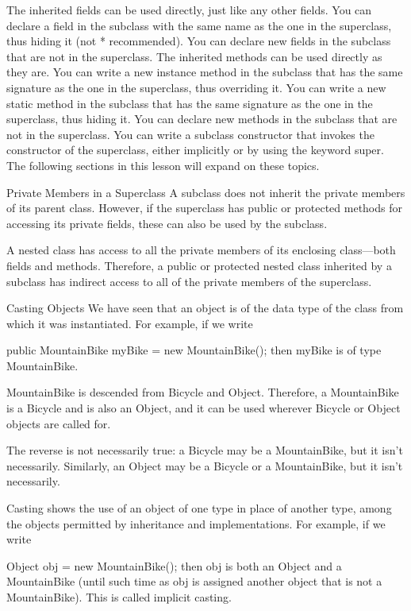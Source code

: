 The inherited fields can be used directly, just like any other fields.
You can declare a field in the subclass with the same name as the one in the superclass, thus hiding it (not * recommended).
You can declare new fields in the subclass that are not in the superclass.
The inherited methods can be used directly as they are.
You can write a new instance method in the subclass that has the same signature as the one in the superclass, thus overriding it.
You can write a new static method in the subclass that has the same signature as the one in the superclass, thus hiding it.
You can declare new methods in the subclass that are not in the superclass.
You can write a subclass constructor that invokes the constructor of the superclass, either implicitly or by using the keyword super.
The following sections in this lesson will expand on these topics.

Private Members in a Superclass
A subclass does not inherit the private members of its parent class. However, if the superclass has public or protected methods for accessing its private fields, these can also be used by the subclass.

A nested class has access to all the private members of its enclosing class—both fields and methods. Therefore, a public or protected nested class inherited by a subclass has indirect access to all of the private members of the superclass.

Casting Objects
We have seen that an object is of the data type of the class from which it was instantiated. For example, if we write

public MountainBike myBike = new MountainBike();
then myBike is of type MountainBike.

MountainBike is descended from Bicycle and Object. Therefore, a MountainBike is a Bicycle and is also an Object, and it can be used wherever Bicycle or Object objects are called for.

The reverse is not necessarily true: a Bicycle may be a MountainBike, but it isn't necessarily. Similarly, an Object may be a Bicycle or a MountainBike, but it isn't necessarily.

Casting shows the use of an object of one type in place of another type, among the objects permitted by inheritance and implementations. For example, if we write

Object obj = new MountainBike();
then obj is both an Object and a MountainBike (until such time as obj is assigned another object that is not a MountainBike). This is called implicit casting.

